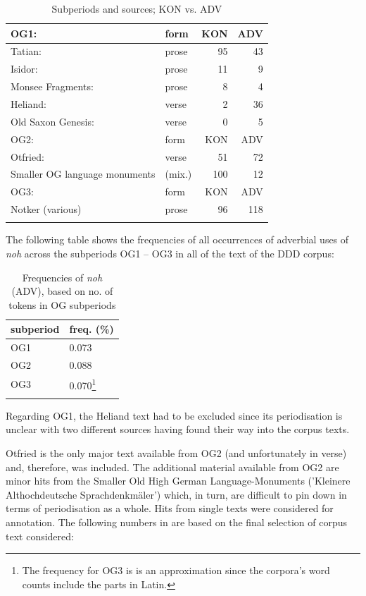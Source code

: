 \documentclass[output=paper
,modfonts
,nonflat]{langsci/langscibook}
\begin{document}
\begin{table}[p]
\begin{tabular}{llrr}
\lsptoprule
{OG1:} & {form} & {KON} & {ADV}  \\
\midrule
Tatian: & prose & 95 & 43  \\
Isidor: & prose & 11 & 9 \\
Monsee Fragments: & prose & 8 & 4 \\
Heliand: & verse & 2 & 36 \\ %
Old Saxon Genesis: & verse & 0 & 5 \\
\midrule
{OG2:} & {form} & {KON} & {ADV}  \\
\midrule
Otfried: & verse & 51 & 72 \\
Smaller OG language monuments & (mix.) & 100 & 12 \\
\midrule
{OG3:} & {form} & {KON} & {ADV}  \\
\midrule
Notker (various) & prose & 96 & 118 \\
\lspbottomrule
\end{tabular}
\caption{Subperiods and sources; KON vs. ADV}
\label{tab:overview_subperiods_and_sources}
\end{table}

\noindent The following table shows the frequencies of all occurrences of adverbial uses of \textit{noh} across the subperiods OG1 -- OG3 in all of the text of the DDD corpus:

\begin{table}[p]
\begin{tabular}{ll}
\lsptoprule
subperiod	& freq. (\%)	\\
\midrule
OG1		& 0.073 \\
OG2		& 0.088 \\
OG3		& 0.070\footnote{The frequency for OG3 is is an approximation since the corpora's word counts include the parts in Latin.}\\
\lspbottomrule
\end{tabular}
\caption{Frequencies of \textit{noh} (ADV), based on no. of tokens in OG subperiods}
\label{tab:frequencies_of_noh}
\end{table}

\noindent Regarding OG1, the Heliand text had to be excluded since its periodisation is unclear with two different sources having found their way into the corpus texts.

Otfried is the only major text available from OG2 (and unfortunately in verse) and, therefore, was included. The additional material available from OG2 are minor hits from the Smaller Old High German Language-Monuments ('Kleinere Althochdeutsche Sprachdenkmäler') which, in turn, are difficult to pin down in terms of periodisation as a whole. Hits from single texts were considered for annotation. The following numbers in  are based on the final selection of corpus text considered:
\end{document}

